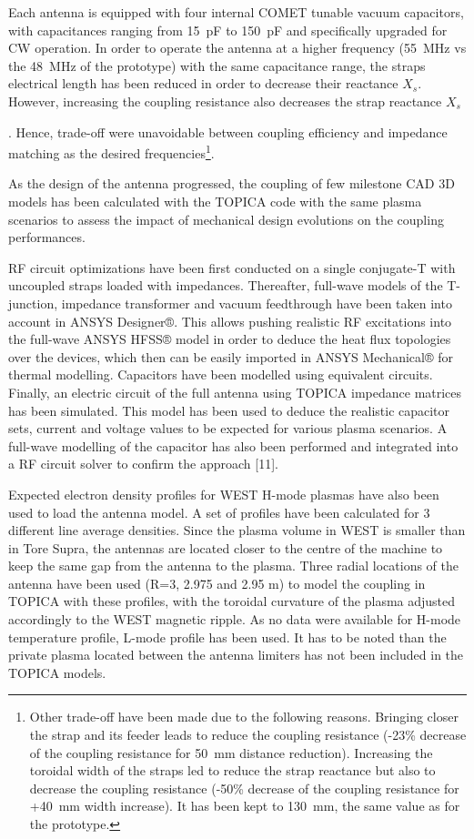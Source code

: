 Each antenna is equipped with four internal COMET tunable vacuum capacitors, with capacitances ranging from 15~pF to 150~pF and specifically upgraded for CW operation. In order to operate the antenna at a higher frequency (55~MHz vs the 48~MHz of the prototype) with the same capacitance range, the straps electrical length has been reduced in order to decrease their reactance $X_s$. However, increasing the coupling resistance also decreases the strap reactance $X_s$ {. Hence, trade-off were unavoidable between coupling efficiency and impedance matching as the desired frequencies\footnote{Other trade-off have been made due to the following reasons. Bringing closer the strap and its feeder leads to reduce the coupling resistance (-23\% decrease of the coupling resistance for 50~mm distance reduction). Increasing the toroidal width of the straps led to reduce the strap reactance but also to decrease the coupling resistance (-50\% decrease of the coupling resistance for +40~mm width increase). It has been kept to 130~mm, the same value as for the prototype.}. 

As the design of the antenna progressed, the coupling of few milestone CAD 3D models has been calculated with the TOPICA code  with the same plasma scenarios to assess the impact of mechanical design evolutions on the coupling performances.



RF circuit optimizations have been first conducted on a single conjugate-T with uncoupled straps loaded with impedances. Thereafter, full-wave models of the T-junction, impedance transformer and vacuum feedthrough have been taken into account in ANSYS Designer®. This allows pushing realistic RF excitations into the full-wave ANSYS HFSS® model in order to deduce the heat flux topologies over the devices, which then can be easily imported in ANSYS Mechanical® for thermal modelling. Capacitors have been modelled using equivalent circuits. Finally, an electric circuit of the full antenna using TOPICA impedance matrices has been simulated. This model has been used to deduce the realistic capacitor sets, current and voltage values to be expected for various plasma scenarios. A full-wave modelling of the capacitor has also been performed and integrated into a RF circuit solver to confirm the approach [11].

Expected electron density profiles for WEST H-mode plasmas have also been used to load the antenna model. A set of profiles have been calculated for 3 different line average densities. Since the plasma volume in WEST is smaller than in Tore Supra, the antennas are located closer to the centre of the machine to keep the same gap from the antenna to the plasma. Three radial locations of the antenna have been used (R=3, 2.975 and 2.95 m) to model the coupling in TOPICA with these profiles, with the toroidal curvature of the plasma adjusted accordingly to the WEST magnetic ripple. As no data were available for H-mode temperature profile, L-mode profile has been used. It has to be noted than the private plasma located between the antenna limiters has not been included in the TOPICA models.

}
